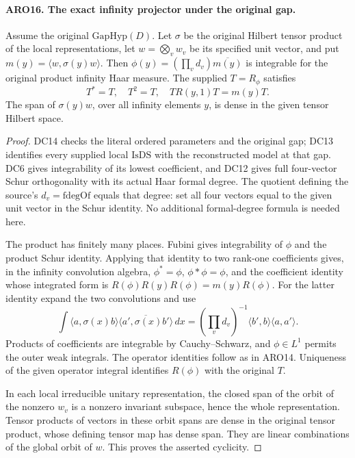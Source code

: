 \documentclass[11pt,a4paper]{article}
\numberwithin{equation}{section}
\theoremstyle{remark}\newtheorem{remark}[theorem]{Remark}
\begin{document}
\paragraph{ARO16. The exact infinity projector under the original gap.}
\label{claim:ARO16}
Assume the original \(\mathrm{GapHyp}(D)\).  Let \(\sigma\) be
the original Hilbert tensor product of the local representations,
let \(w=\bigotimes_vw_v\) be its specified unit vector, and put
\(m(y)=\langle w,\sigma(y)w\rangle\).  Then
\(\phi(y)=(\prod_vd_v)\overline{m(y)}\) is integrable for the
original product infinity Haar measure.  The supplied
\(T=R_\phi\) satisfies
\[
 T^*=T,\quad T^2=T,\quad
                 T R(y,1)T=m(y)T.                    \tag{ARO.19}
\]
The span of \(\sigma(y)w\), over all infinity elements \(y\),
is dense in the given tensor Hilbert space.
\begin{proof}
DC14 checks the literal ordered parameters and the original gap;
DC13 identifies every supplied local \(\mathrm{IsDS}\) with the
reconstructed model at that gap.  DC6 gives integrability of its
lowest coefficient, and DC12 gives full four-vector Schur
orthogonality with its actual Haar formal degree.  The quotient
defining the source's \(d_v=\mathrm{fdegOf}\) equals that degree:
set all four vectors equal to the given unit vector in the Schur
identity.  No additional formal-degree formula is needed here.

The product has finitely many places.  Fubini gives integrability
of \(\phi\) and the product Schur identity.  Applying that identity
to two rank-one coefficients gives, in the infinity convolution
algebra,
\(\phi^*=\phi\), \(\phi*\phi=\phi\), and the coefficient identity
whose integrated form is \(R(\phi)R(y)R(\phi)=m(y)R(\phi)\).
For the latter identity expand the two convolutions and use
\[
 \int\langle a,\sigma(x)b\rangle
             \overline{\langle a',\sigma(x)b'\rangle}\,dx
  = (\prod_vd_v)^{-1}\langle b',b\rangle\langle a,a'\rangle.
\]
Products of coefficients are integrable by Cauchy--Schwarz, and
\(\phi\in L^1\) permits the outer weak integrals.  The operator
identities follow as in ARO14.  Uniqueness of the given operator
integral identifies \(R(\phi)\) with the original \(T\).

In each local irreducible unitary representation, the closed span
of the orbit of the nonzero \(w_v\) is a nonzero invariant subspace,
hence the whole representation.  Tensor products of vectors in
these orbit spans are dense in the original tensor product, whose
defining tensor map has dense span.  They are linear combinations
of the global orbit of \(w\).  This proves the asserted cyclicity.
\end{proof}
\end{document}
